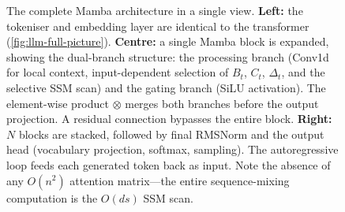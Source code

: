 \begin{landscape}
\begin{figure}[p]
\caption[The complete Mamba architecture in a single view.]{%
  The complete Mamba architecture in a single view. \textbf{Left:}
  the tokeniser and embedding layer are identical to the transformer
  (\cref{fig:llm-full-picture}). \textbf{Centre:} a single Mamba
  block is expanded, showing the dual-branch structure: the
  processing branch (Conv1d for local context, input-dependent
  selection of $B_t$, $C_t$, $\Delta_t$, and the selective SSM scan)
  and the gating branch (SiLU activation). The element-wise product
  $\otimes$ merges both branches before the output projection. A
  residual connection bypasses the entire block. \textbf{Right:}
  $N$ blocks are stacked, followed by final RMSNorm and the output
  head (vocabulary projection, softmax, sampling). The autoregressive
  loop feeds each generated token back as input. Note the absence of
  any $O(n^2)$ attention matrix---the entire sequence-mixing
  computation is the $O(ds)$ SSM scan.}
\label{fig:mamba-full-picture}
\end{figure}
\end{landscape}
